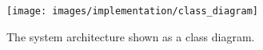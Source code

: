 
\begin{figure}[H]
	\centering
    \texttt{[image: images/implementation/class\_diagram]}
    \caption[Class diagram]{The system architecture shown as a class diagram.}
    \label{fig:class_diagram}
\end{figure}
